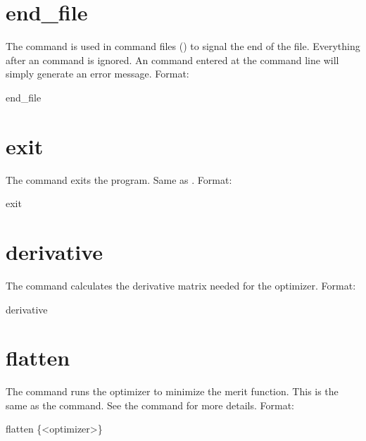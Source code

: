 \section{end_file} \label{s:end.file}

The  command is used in command files () to signal the
end of the file. Everything after an  command is ignored. An 
command entered at the command line will simply generate an error message.  Format:
\begin{example}
  end_file
\end{example}

\section{exit}
\label{s:exit}

The  command exits the program. Same as .  Format:
\begin{example}
  exit
\end{example}

\section{derivative}
\label{s:deriv}

The  command calculates the  derivative matrix needed
for the  optimizer.  Format:
\begin{example}
  derivative
\end{example}

\section{flatten}
\label{s:flatten}

The  command runs the optimizer to minimize the merit function. This is the
same as the  command.  See the  command for more
details.  Format:
\begin{example}
  flatten \{<optimizer>\}
\end{example}

\vskip 10pt

